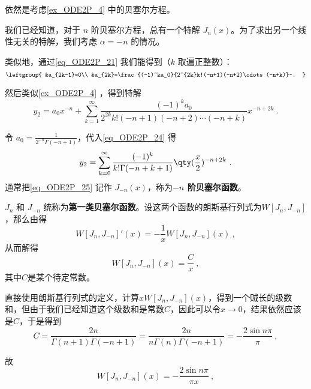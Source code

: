 \begin{example}{}\label{ex_ODE2P_5}
依然是考虑\autoref{ex_ODE2P_4} 中的贝塞尔方程。

我们已经知道，对于 $n$ 阶贝塞尔方程，总有一个特解 $J_n(x)$。为了求出另一个线性无关的特解，我们考虑 $\alpha=-n$ 的情况。

类似地，通过\autoref{eq_ODE2P_21} 我们能得到（$k$ 取遍正整数）：
\begin{equation}
\leftgroup{
    &a_{2k-1}=0\\
    &a_{2k}=\frac{(-1)^ka_0}{2^{2k}k!(-n+1)(-n+2)\cdots(-n+k)}~.
}
\end{equation}

然后类似\autoref{ex_ODE2P_4} ，得到特解
\begin{equation}\label{eq_ODE2P_24}
y_2=a_0x^{-n}+\sum\limits^\infty_{k=1}\frac{(-1)^ka_0}{2^{2k}k!(-n+1)(-n+2)\cdots(-n+k)}x^{-n+2k}~.
\end{equation}

令 $a_0=\frac{1}{2^{-n}\Gamma(-n+1)}$，代入\autoref{eq_ODE2P_24} 得
\begin{equation}\label{eq_ODE2P_25}
y_2=\sum\limits^\infty_{k=0}\frac{(-1)^k}{k!\Gamma(-n+k+1)}\qty(\frac{x}{2})^{-n+2k}~.
\end{equation}
通常把\autoref{eq_ODE2P_25} 记作 $J_{-n}(x)$，称为\textbf{$-n$ 阶贝塞尔函数}。



\end{example}

$J_n$ 和 $J_{-n}$ 统称为\textbf{第一类贝塞尔函数}。设这两个函数的朗斯基行列式为$W[J_n, J_{-n}]$，那么由得
\begin{equation}
W[J_n, J_{-n}]'(x)=-\frac{1}{x}W[J_n, J_{-n}](x)~,
\end{equation}
从而解得
\begin{equation}
W[J_n, J_{-n}](x) = \frac{C}{x}~,
\end{equation}
其中$C$是某个待定常数。

直接使用朗斯基行列式的定义，计算$xW[J_n, J_{-n}](x)$，得到一个贼长的级数和，但由于我们已经知道这个级数和是常数$C$，因此可以令$x\to 0$，结果依然应该是$C$，于是得到
\begin{equation}
C = \frac{2n}{\Gamma(n+1)\Gamma(-n+1)} = \frac{2n}{n\Gamma(n)\Gamma(-n+1)} = -\frac{2\sin n\pi}{\pi}~,
\end{equation}

故
\begin{equation}\label{eq_ODE2P_26}
W[J_n, J_{-n}](x) = -\frac{2\sin n\pi}{\pi x}~,
\end{equation}

